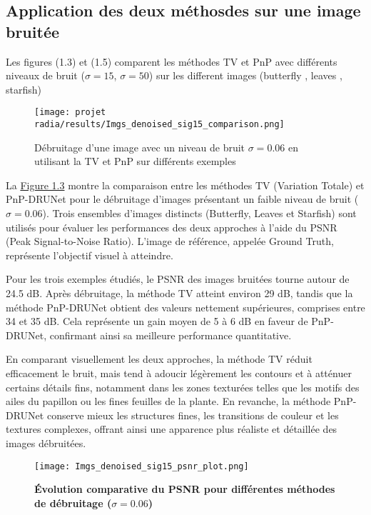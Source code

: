 \documentclass[a4paper, 12pt]{report} %
\begin{document}
\subsection{Application des deux méthosdes sur une image bruitée}
Les figures (1.3) et (1.5)  comparent les méthodes TV et PnP avec différents niveaux de bruit (\(\sigma=15\), \(\sigma=50\)) sur les different images (butterfly , leaves , starfish)

\begin{figure}[H]
    \centering
    \texttt{[image: projet radia/results/Imgs\_denoised\_sig15\_comparison.png]}   
    \caption{ Débruitage d'une image avec un niveau de bruit $\sigma = 0.06$ en utilisant la TV et PnP  sur différents exemples  } 
    
    \label{fig:4}
\end{figure}   

La \hyperref[fig:4]{Figure 1.3} montre la comparaison entre les méthodes TV (Variation Totale) et PnP-DRUNet pour le débruitage d’images présentant un faible niveau de bruit (\(\sigma=0.06\)). Trois ensembles d’images distincts (Butterfly, Leaves et Starfish) sont utilisés pour évaluer les performances des deux approches à l’aide du PSNR (Peak Signal-to-Noise Ratio). L’image de référence, appelée Ground Truth, représente l’objectif visuel à atteindre.

Pour les trois exemples étudiés, le PSNR des images bruitées tourne autour de 24.5 dB. Après débruitage, la méthode TV atteint environ 29 dB, tandis que la méthode PnP-DRUNet obtient des valeurs nettement supérieures, comprises entre 34 et 35 dB. Cela représente un gain moyen de 5 à 6 dB en faveur de PnP-DRUNet, confirmant ainsi sa meilleure performance quantitative.

En comparant visuellement les deux approches, la méthode TV réduit efficacement le bruit, mais tend à adoucir légèrement les contours et à atténuer certains détails fins, notamment dans les zones texturées telles que les motifs des ailes du papillon ou les fines feuilles de la plante. En revanche, la méthode PnP-DRUNet conserve mieux les structures fines, les transitions de couleur et les textures complexes, offrant ainsi une apparence plus réaliste et détaillée des images débruitées. 



\begin{figure}[H]
    \centering
    \texttt{[image: Imgs\_denoised\_sig15\_psnr\_plot.png]}
    \caption{\textbf{Évolution comparative du PSNR pour différentes méthodes de débruitage (\(\sigma = 0.06\))}
 }
    \label{fig:5}
\end{figure}  
\end{document}
